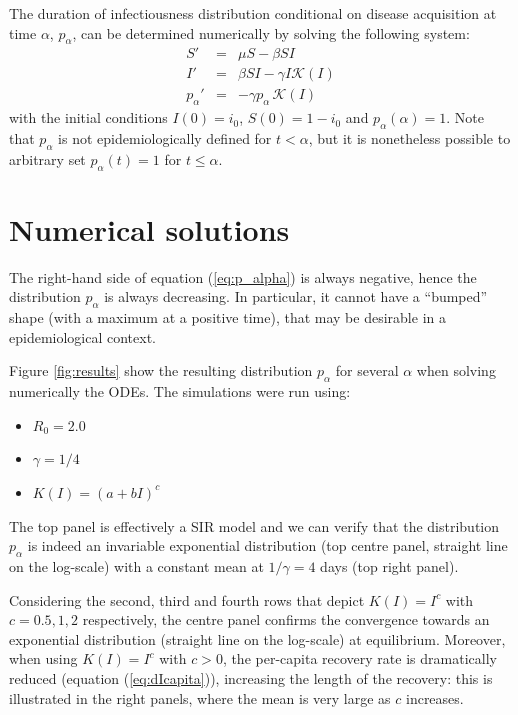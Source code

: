 \documentclass[12pt, twocolumn]{article}   	%
\newcommand{\K}{\mathcal{K}}
\newcommand{\eqref}[1]{(\ref{#1})}
\begin{document}
The duration of infectiousness distribution conditional on disease acquisition at time $\alpha$, $p_\alpha$, can be determined numerically by solving the following system:
\begin{eqnarray}
S' & = & \mu S - \beta SI \\
I' & = & \beta S I - \gamma I \K(I)\\ 
p_\alpha' & = & - \gamma p_\alpha\, \K(I) \label{eq:p_alpha}
\end{eqnarray}
with the initial conditions $I(0) = i_0$, $S(0)=1-i_0$ and $p_\alpha(\alpha)=1$. Note that $p_\alpha$ is not epidemiologically defined for $t<\alpha$, but it is nonetheless possible to arbitrary set $p_\alpha(t)=1$ for $t\leq \alpha$.

\section{Numerical solutions}

The right-hand side of equation \eqref{eq:p_alpha} is always negative, hence the distribution $p_\alpha$ is always decreasing. In particular, it cannot have a ``bumped'' shape (with a maximum at a positive time), that may be desirable in a epidemiological context. 

Figure \ref{fig:results} show the resulting distribution $p_\alpha$ for several $\alpha$ when solving numerically the ODEs. The simulations were run using:
\begin{itemize}
\item $R_0 = 2.0$
\item $\gamma = 1/4$
\item $K(I) = (a+bI)^c$
\end{itemize}

The top panel is effectively a SIR model and we can verify that the distribution $p_\alpha$ is indeed an invariable exponential distribution (top centre panel, straight line on the log-scale) with a constant mean at $1/\gamma = 4$ days (top right panel).

Considering the second, third and fourth rows that depict $K(I)=I^c$ with $c=0.5,1,2$ respectively, the centre panel confirms the convergence towards an exponential distribution (straight line on the log-scale) at equilibrium. Moreover, when using $K(I)=I^c$ with $c>0$, the per-capita recovery rate is dramatically reduced (equation \eqref{eq:dIcapita}), increasing the length of the recovery: this is illustrated in the right panels, where the mean is very large as $c$ increases. 
\end{document}
